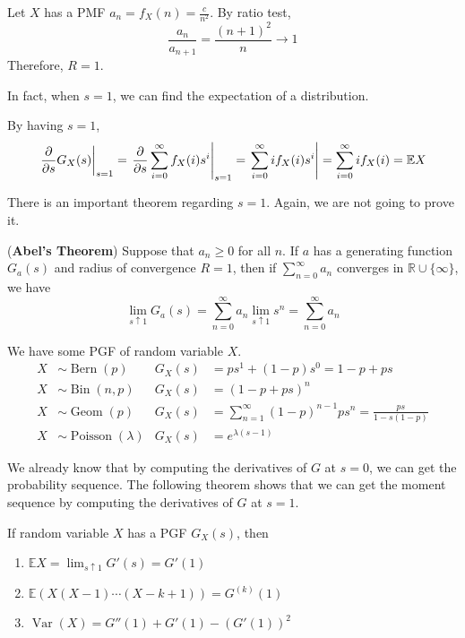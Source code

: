 \documentclass{huhtakm-template-book}
\newcommand{\expect}{\mathbb{E}}
\DeclareMathOperator{\Bern}{Bern}
\DeclareMathOperator{\Bin}{Bin}
\DeclareMathOperator{\Geom}{Geom}
\DeclareMathOperator{\Poisson}{Poisson}
\DeclareMathOperator{\Var}{Var}
\begin{document}
\begin{eg}
	Let $X$ has a PMF $a_{n}=f_{X}(n)=\frac{c}{n^{2}}$. By ratio test,
	\begin{equation*}
		\frac{a_{n}}{a_{n+1}}=\frac{(n+1)^{2}}{n}\to 1
	\end{equation*}
	Therefore, $R=1$.
\end{eg}
In fact, when $s=1$, we can find the expectation of a distribution.
\begin{eg}
	\label{Chapter 6 (Example) Expectation from PGF}
	By having $s=1$,
	\begin{equation*}
		\left.\pdv*{G_{X}(s)}{s}\right|_{s=1}=\left.\pdv*{\sum_{i=0}^{\infty}f_{X}(i)s^{i}}{s}\right|_{s=1}=\left.\sum_{i=0}^{\infty}if_{X}(i)s^{i}\right|=\sum_{i=0}^{\infty}if_{X}(i)=\expect X
	\end{equation*}
\end{eg}
There is an important theorem regarding $s=1$. Again, we are not going to prove it.
\begin{thm}(\textbf{Abel's Theorem})
	Suppose that $a_{n}\geq 0$ for all $n$. If $a$ has a generating function $G_{a}(s)$ and radius of convergence $R=1$, then if $\sum_{n=0}^{\infty}a_{n}$ converges in $\mathbb{R}\cup\{\infty\}$, we have
	\begin{equation*}
		\lim_{s\uparrow 1}G_{a}(s)=\sum_{n=0}^{\infty}a_{n}\lim_{s\uparrow 1}s^{n}=\sum_{n=0}^{\infty}a_{n}
	\end{equation*}
\end{thm}
\begin{eg}
	We have some PGF of random variable $X$.
	\begin{align*}
		X&\sim\Bern(p) & G_{X}(s)&=ps^{1}+(1-p)s^{0}=1-p+ps\\
		X&\sim\Bin(n,p) & G_{X}(s)&=(1-p+ps)^{n}\\
		X&\sim\Geom(p) & G_{X}(s)&=\sum_{n=1}^{\infty}(1-p)^{n-1}ps^{n}=\frac{ps}{1-s(1-p)}\\
		X&\sim\Poisson(\lambda) & G_{X}(s)&=e^{\lambda(s-1)}
	\end{align*}
\end{eg}
We already know that by computing the derivatives of $G$ at $s=0$, we can get the probability sequence. The following theorem shows that we can get the moment sequence by computing the derivatives of $G$ at $s=1$.
\begin{thm}
	If random variable $X$ has a PGF $G_{X}(s)$, then
	\begin{enumerate}
		\item $\expect X=\lim_{s\uparrow 1}G'(s)=G'(1)$
		\item $\expect(X(X-1)\cdots(X-k+1))=G^{(k)}(1)$
		\item $\Var(X)=G''(1)+G'(1)-(G'(1))^{2}$
	\end{enumerate}
\end{thm}
\end{document}
